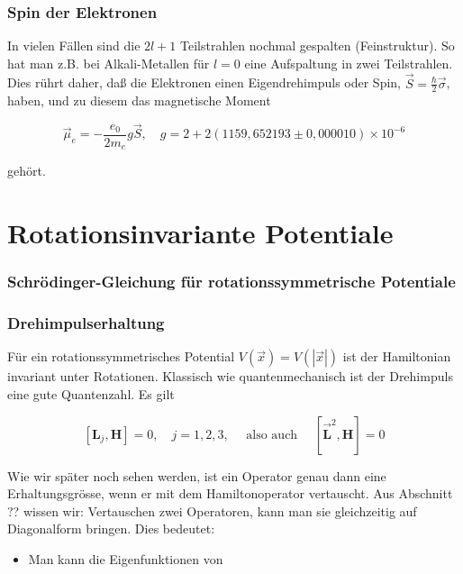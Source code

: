 \documentclass[10pt, letterpaper]{article}
\begin{document}
\subsubsection*{Spin der Elektronen}
In vielen Fällen sind die $2 l+1$ Teilstrahlen nochmal gespalten (Feinstruktur). So hat man z.B. bei Alkali-Metallen für $l=0$ eine Aufspaltung in zwei Teilstrahlen. Dies rührt daher, daß die Elektronen einen Eigendrehimpuls oder Spin, $\vec{S}=\frac{\hbar}{2} \vec{\sigma}$, haben, und zu diesem das magnetische Moment

$$
\vec{\mu}_{e}=-\frac{e_{0}}{2 m_{e}} g \vec{S}, \quad g=2+2(1159,652193 \pm 0,000010) \times 10^{-6}
$$

gehört.






\pagebreak






\section{Rotationsinvariante Potentiale}


\subsubsection*{Schrödinger-Gleichung für rotationssymmetrische Potentiale}

\subsubsection*{Drehimpulserhaltung}
Für ein rotationssymmetrisches Potential $V(\vec{x})=V(|\vec{x}|)$ ist der Hamiltonian invariant unter Rotationen. Klassisch wie quantenmechanisch ist der Drehimpuls eine gute Quantenzahl. Es gilt

$$
\left[\mathbf{L}_{j}, \mathbf{H}\right]=0, \quad j=1,2,3, \quad \text { also auch } \quad\left[\overrightarrow{\mathbf{L}}^{2}, \mathbf{H}\right]=0
$$

Wie wir später noch sehen werden, ist ein Operator genau dann eine Erhaltungsgrösse, wenn er mit dem Hamiltonoperator vertauscht. Aus Abschnitt ?? wissen wir: Vertauschen zwei Operatoren, kann man sie gleichzeitig auf Diagonalform bringen. Dies bedeutet:

\begin{itemize}
  \item Man kann die Eigenfunktionen von
\end{itemize}
\end{document}
